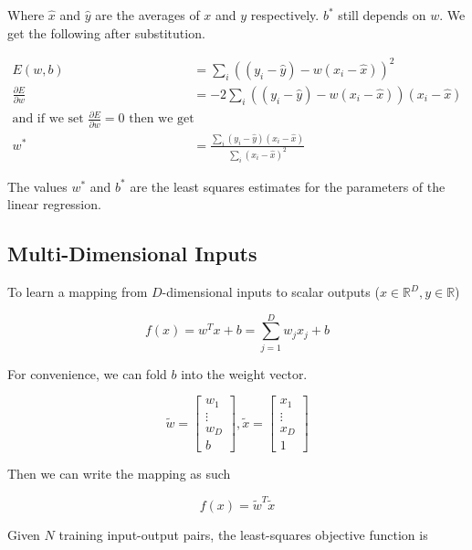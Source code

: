 \documentclass[12pt]{article}
\begin{document}
Where $\hat{x}$ and $\hat{y}$ are the averages of $x$ and $y$ respectively. $b^*$ still depends on $w$. We get the following after substitution.

\begin{align*}
    E(w,b) &= \sum_i ((y_i - \hat{y}) - w (x_i - \hat{x}))^2\\
    \frac{\partial E}{\partial w} &= -2 \sum_i ((y_i - \hat{y}) - w(x_i - \hat{x}))(x_i - \hat{x})\\
    \text{and if we set $\frac{\partial E}{\partial w} = 0$ then we get}\\
    w^* &= \frac{\sum_i (y_i - \hat{y})(x_i - \hat{x})}{\sum_i (x_i - \hat{x})^2}
\end{align*}

The values $w^*$ and $b^*$ are the least squares estimates for the parameters of the linear regression.

\subsection{Multi-Dimensional Inputs}

To learn a mapping from $D$-dimensional inputs to scalar outputs ($x\in\mathbb{R}^D, y \in\mathbb{R}$)

$$f(x) = w^T x + b = \sum^D_{j=1} w_j x_j + b$$

For convenience, we can fold $b$ into the weight vector.

$$\tilde{w} = \begin{bmatrix}
   w_{1} \\
   \vdots \\
   w_{D}\\
   b
 \end{bmatrix}, \tilde{x} = \begin{bmatrix}
   x_{1} \\
   \vdots \\
   x_{D} \\
   1
 \end{bmatrix}$$
 
Then we can write the mapping as such

$$f(x) = \tilde{w}^T \tilde{x}$$

Given $N$ training input-output pairs, the least-squares objective function is 
\end{document}
